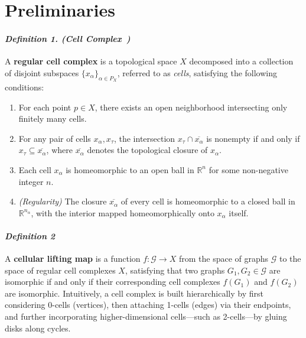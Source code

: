 \section{Preliminaries}
\paragraph{\textit{Definition 1. (Cell Complex~\cite{HGh19})}} 
A \textbf{regular cell complex} is a topological space $X$ decomposed into a collection of disjoint subspaces $\{x_\alpha\}_{\alpha \in P_X}$, referred to as \textit{cells}, satisfying the following conditions:
\begin{enumerate}[left=1.2em, label=\arabic*.]
    \item For each point $p \in X$, there exists an open neighborhood intersecting only finitely many cells.
    \item For any pair of cells $x_\alpha, x_\tau$, the intersection $x_\tau \cap \overline{x_\alpha}$ is nonempty if and only if $x_\tau \subseteq \overline{x_\alpha}$, where $\overline{x_\alpha}$ denotes the topological closure of $x_\alpha$.
    \item Each cell $x_\alpha$ is homeomorphic to an open ball in $\mathbb{R}^n$ for some non-negative integer $n$.
    \item \textit{(Regularity)} The closure $\overline{x_\alpha}$ of every cell is homeomorphic to a closed ball in $\mathbb{R}^{n_\alpha}$, with the interior mapped homeomorphically onto $x_\alpha$ itself.
\end{enumerate}
\paragraph{\textit{Definition 2}} A \textbf{cellular lifting map} is a function \( f: \mathcal{G} \to X \) from the space of graphs \(\mathcal{G}\) to the space of regular cell complexes \(X\), satisfying that two graphs \(G_1, G_2 \in \mathcal{G}\) are isomorphic if and only if their corresponding cell complexes \(f(G_1)\) and \(f(G_2)\) are isomorphic. Intuitively, a cell complex is built hierarchically by first considering 0-cells (vertices), then attaching 1-cells (edges) via their endpoints, and further incorporating higher-dimensional cells—such as 2-cells—by gluing disks along cycles.

